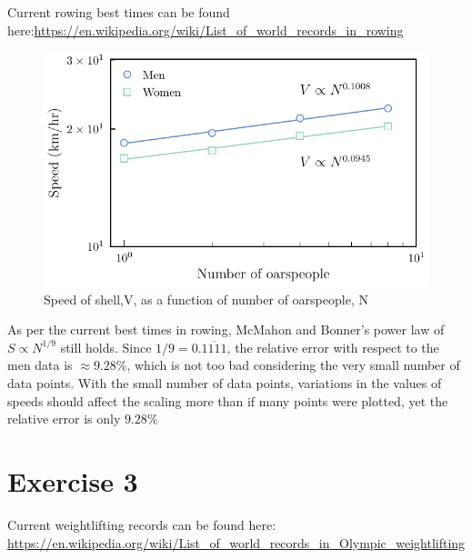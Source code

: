 \documentclass{article}
\begin{document}
Current rowing best times can be found here:\url{https://en.wikipedia.org/wiki/List_of_world_records_in_rowing}

\begin{figure}[h!]
  \includegraphics[width=\linewidth]{Q02/rowingPowerLaw.pdf}
  \caption{Speed of shell,V, as a function of number of oarspeople, N}
  \label{fig:rowingPowerLawPlot}
\end{figure}

As per the current best times in rowing, McMahon and Bonner's power law of $S \propto N^{1/9}$ still holds. Since $1/9 = 0.\overline{1111}$, the relative error with respect to the men data is $\approx 9.28\%$, which is not too bad considering the very small number of data points. With the small number of data points, variations in the values of speeds should affect the scaling more than if many points were plotted, yet the relative error is only $9.28\%$

\section{Exercise 3}

Current weightlifting records can be found here: \url{https://en.wikipedia.org/wiki/List_of_world_records_in_Olympic_weightlifting}
\end{document}
